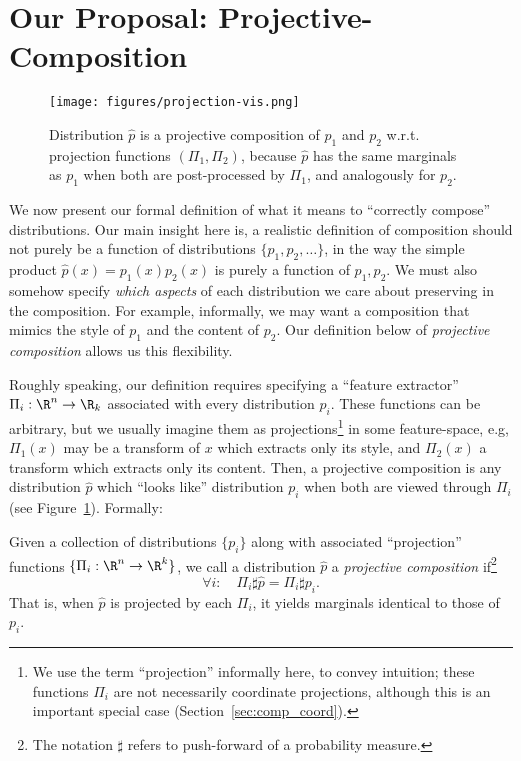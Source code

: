 \section{Our Proposal: Projective-Composition}
\label{sec:composition}

\begin{figure}
    \centering
    \texttt{[image: figures/projection-vis.png]}
    \caption{
    Distribution $\hat{p}$ is a projective composition
    of $p_1$ and $p_2$ w.r.t. projection functions $(\Pi_1, \Pi_2)$,
    because $\hat{p}$ has the same marginals as $p_1$ when 
    both are post-processed by $\Pi_1$, and analogously for $p_2$.
    }
    \label{fig:projection-vis}
\end{figure}

We now present our formal definition of what it means to ``correctly compose'' distributions.
Our main insight here is, a realistic definition of composition should not
purely be a function of distributions $\{p_1, p_2, \dots \}$, in the way 
the simple product $\hat{p}(x) = p_1(x) p_2(x)$ is purely a function of $p_1, p_2$.
We must also somehow specify 
\emph{which aspects} of each distribution we care about preserving in the composition.
For example, informally, we may want a composition that mimics the style of $p_1$
and the content of $p_2$.
Our definition below of \emph{projective composition} allows us this flexibility.

Roughly speaking, our definition requires specifying a ``feature extractor''
$\Pi_i: \R^n \to \R_k$ associated with every distribution $p_i$.
These functions can be arbitrary, but we usually imagine them as projections\footnote{
We use the term ``projection'' informally here, to convey intuition;
these functions $\Pi_i$ are not necessarily coordinate projections, although this is an important special case (Section~\ref{sec:comp_coord}).
} in
some feature-space, e.g, $\Pi_1(x)$ may be a transform of $x$ which extracts only its style,
and $\Pi_2(x)$ a transform which extracts only its content.
Then, a projective composition is any distribution $\hat{p}$ which
``looks like'' distribution $p_i$ when both are viewed through $\Pi_i$
(see Figure~\ref{fig:projection-vis}).
Formally:

\begin{definition} 
\label{def:proj_comp}
Given a collection of distributions $\{p_i\}$ along with
associated ``projection'' functions $\{\Pi_i: \R^n \to \R^k\}$,
we call a distribution $\hat{p}$ a \emph{projective composition} if\footnote{
The notation $\sharp$ refers to push-forward of a probability measure.
}
\begin{equation}
\label{eqn:proj_comp}
\forall i: \quad
\Pi_i \sharp \hat{p} = \Pi_i \sharp p_i.
\end{equation}
That is, when $\hat{p}$ is projected by each $\Pi_i$,
it yields marginals identical to those of $p_i$.
\end{definition}

